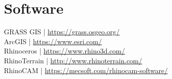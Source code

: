 \documentclass[11pt,article,oneside]{memoir}
\begin{document}
\section{Software}
GRASS GIS | \url{https://grass.osgeo.org/} \\
ArcGIS | \url{https://www.esri.com/} \\
Rhinoceros | \url{https://www.rhino3d.com/}\\
RhinoTerrain | \url{http://www.rhinoterrain.com/}\\
RhinoCAM | \url{https://mecsoft.com/rhinocam-software/}\\

\clearpage

\end{document}
